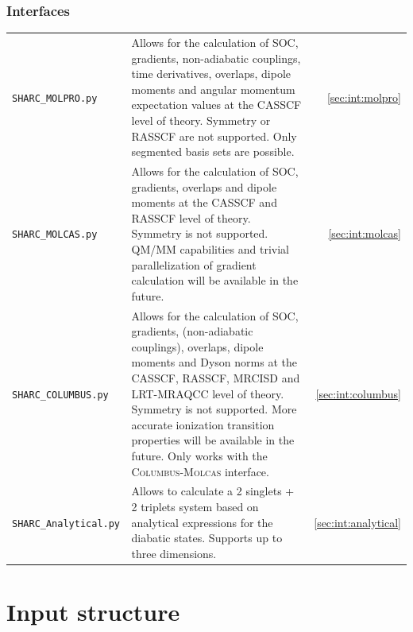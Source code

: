 \documentclass[a4paper,11pt,DIV=15,openany,twoside=false]{scrbook}
\newcommand{\sharc}{\textsc{Sharc}}
\begin{document}
\subsection{Interfaces}

\begin{tabular}{>{\tt}lp{9.5cm}r}
  SHARC\_MOLPRO.py      &Allows for the calculation of SOC, gradients, non-adiabatic couplings, time derivatives, overlaps, dipole moments and angular momentum expectation values at the CASSCF level of theory. Symmetry or RASSCF are not supported. Only segmented basis sets are possible.   &\ref{sec:int:molpro}\\
  SHARC\_MOLCAS.py      &Allows for the calculation of SOC, gradients, overlaps and dipole moments at the CASSCF and RASSCF level of theory. Symmetry is not supported. QM/MM capabilities and trivial parallelization of gradient calculation will be available in the future.         &\ref{sec:int:molcas}\\
  SHARC\_COLUMBUS.py    &Allows for the calculation of SOC, gradients, (non-adiabatic couplings), overlaps, dipole moments and Dyson norms at the CASSCF, RASSCF, MRCISD and LRT-MRAQCC level of theory. Symmetry is not supported. More accurate ionization transition properties will be available in the future. Only works with the \textsc{Columbus}-\textsc{Molcas} interface.                  &\ref{sec:int:columbus}\\
  SHARC\_Analytical.py  &Allows to calculate a 2 singlets + 2 triplets system based on analytical expressions for the diabatic states. Supports up to three dimensions.         &\ref{sec:int:analytical}\\
\end{tabular}




\chapter{Input structure}\label{chap:input}

\end{document}
